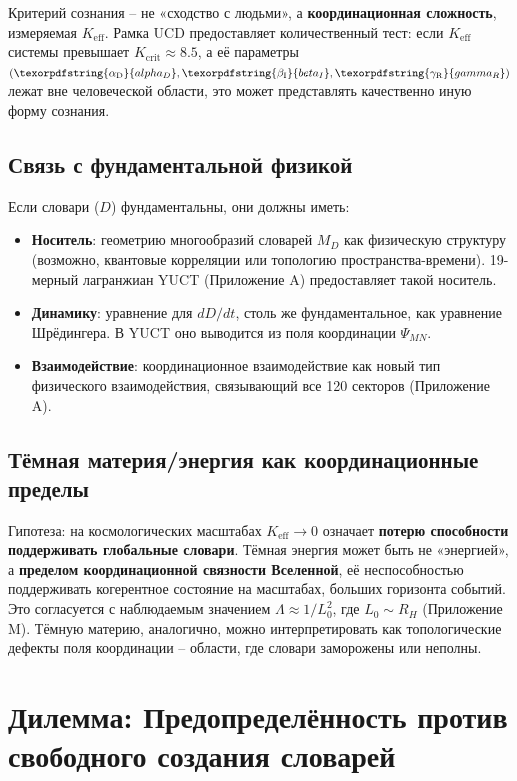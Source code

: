 \documentclass[12pt,a4paper]{article}
\DeclareRobustCommand{\alD}{\texorpdfstring{\ensuremath{\alpha_{\mathrm{D}}}}{alpha_D}}
\DeclareRobustCommand{\beI}{\texorpdfstring{\ensuremath{\beta_{\mathrm{I}}}}{beta_I}}
\DeclareRobustCommand{\gaR}{\texorpdfstring{\ensuremath{\gamma_{\mathrm{R}}}}{gamma_R}}
\newcommand{\eff}{\mathrm{eff}}
\newcommand{\Ke}{K_{\eff}}
\newcommand{\Kcrit}{K_{\mathrm{crit}}}
\begin{document}
	Критерий сознания – не «сходство с людьми», а \textbf{координационная сложность}, измеряемая $\Ke$. Рамка UCD предоставляет количественный тест: если $\Ke$ системы превышает $\Kcrit \approx 8.5$, а её параметры $(\alD, \beI, \gaR)$ лежат вне человеческой области, это может представлять качественно иную форму сознания.
	
	\subsection{Связь с фундаментальной физикой}
	
	Если словари ($D$) фундаментальны, они должны иметь:
	\begin{itemize}
		\item \textbf{Носитель}: геометрию многообразий словарей $M_D$ как физическую структуру (возможно, квантовые корреляции или топологию пространства-времени). 19-мерный лагранжиан YUCT (Приложение A) предоставляет такой носитель.
		\item \textbf{Динамику}: уравнение для $dD/dt$, столь же фундаментальное, как уравнение Шрёдингера. В YUCT оно выводится из поля координации $\Psi_{MN}$.
		\item \textbf{Взаимодействие}: координационное взаимодействие как новый тип физического взаимодействия, связывающий все 120 секторов (Приложение A).
	\end{itemize}
	
	\subsection{Тёмная материя/энергия как координационные пределы}
	
	Гипотеза: на космологических масштабах $\Ke \to 0$ означает \textbf{потерю способности поддерживать глобальные словари}. Тёмная энергия может быть не «энергией», а \textbf{пределом координационной связности Вселенной}, её неспособностью поддерживать когерентное состояние на масштабах, больших горизонта событий. Это согласуется с наблюдаемым значением $\Lambda \approx 1/L_0^2$, где $L_0 \sim R_H$ (Приложение M). Тёмную материю, аналогично, можно интерпретировать как топологические дефекты поля координации – области, где словари заморожены или неполны.
	
	\section{Дилемма: Предопределённость против свободного создания словарей}
	
\end{document}

